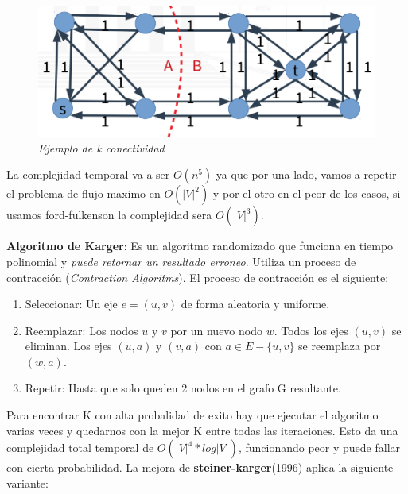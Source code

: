 \documentclass{article}
\begin{document}
\begin{figure}[h!]
    \begin{center} 
    \includegraphics[scale=0.5]{imagenes/ejemplo-k-mincut.png}
    \caption{\small \sl Ejemplo de k conectividad} 
    \end{center}
\end{figure}

La complejidad temporal va a ser \(O(n^5)\) ya que por una lado, vamos a repetir el problema de flujo maximo en \(O(|V|^2)\)
y por el otro en el peor de los casos, si usamos ford-fulkenson la complejidad sera \(O(|V|^3)\).

\textbf{Algoritmo de Karger}: Es un algoritmo randomizado que funciona en tiempo polinomial y
\textit{puede retornar un resultado erroneo}. Utiliza un proceso de contracción 
(\textit{Contraction Algoritms}). El proceso de contracción es el siguiente:

\begin{enumerate}
    \item Seleccionar: Un eje \(e=(u,v)\) de forma aleatoria y uniforme.
    \item Reemplazar: Los nodos \(u\) y \(v\) por un nuevo nodo \(w\). Todos los ejes \((u,v)\) 
    se eliminan. Los ejes \((u,a)\) y \((v,a)\) con \(a \in E - \{u,v\}\) se reemplaza por \((w,a)\).
    \item Repetir: Hasta que solo queden 2 nodos en el grafo G resultante.
\end{enumerate}

Para encontrar K con alta probalidad de exito hay que ejecutar el algoritmo varias veces
y quedarnos con la mejor K entre todas las iteraciones. Esto da una complejidad total temporal 
de \(O(|V|^4*log |V|)\), funcionando peor y puede fallar con 
cierta probabilidad. La mejora de \textbf{steiner-karger}(1996) aplica la siguiente variante:
\end{document}
